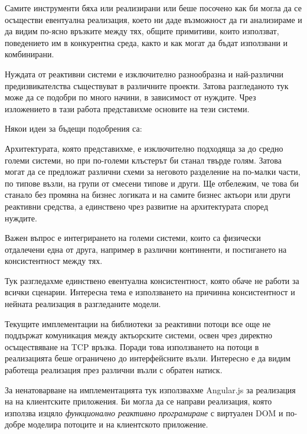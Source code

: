 Самите инструменти бяха или реализирани или беше посочено как би могла да се осъществи евентуална реализация, което ни даде възможност да ги анализираме и да видим по-ясно връзките между тях, общите примитиви, които използват, поведението им в конкурентна среда, както и как могат да бъдат използвани и комбинирани.

Нуждата от реактивни системи е изключително разнообразна и най-различни предизвикателства съществуват в различните проекти. Затова разгледаното тук може да се подобри по много начини, в зависимост от нуждите. Чрез изложението в тази работа представихме основите на тези системи.

Някои идеи за бъдещи подобрения са:

\begin{itemize*}
  \item Архитектурата, която представихме, е изключително подходяща за до средно големи системи, но при по-големи клъстерът би станал твърде голям. Затова могат да се предложат различни схеми за неговото разделение на по-малки части, по типове възли, на групи от смесени типове и други. Ще отбележим, че това би станало без промяна на бизнес логиката и на самите бизнес актьори или други реактивни средства, а единствено чрез развитие на архитектурата според нуждите.
  
  \item Важен въпрос е интегрирането на големи системи, които са физически отдалечени една от друга, например в различни континенти, и постигането на консистентност между тях.
  
  \item Тук разгледахме единствено евентуална консистентност, която обаче не работи за всички сценарии. Интересна тема е използването на причинна консистентност и нейната реализация в разгледаните модели.
  
  \item Текущите имплементации на библиотеки за реактивни потоци все още не поддържат комуникация между актьорските системи, освен чрез директно осъществяване на TCP връзка. Поради това използването на потоци в реализацията беше ограничено до интерфейсните възли. Интересно е да видим работеща реализация през различни възли с обратен натиск.
  
  \item За ненатоварване на имплементацията тук използвахме Angular.js за реализация на  на клиентските приложения. Би могла да се направи реализация, която използва изцяло \emph{функционално реактивно програмиране} с виртуален DOM и по-добре моделира потоците и на клиентското приложение.
\end{itemize*}
